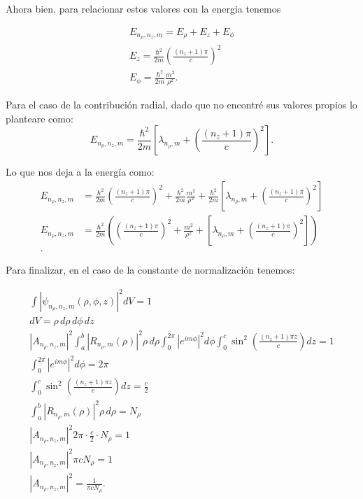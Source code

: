 \documentclass{report}
\begin{document}
Ahora bien, para relacionar estos valores con la energia tenemos

\begin{align*}
  E_{n_\rho, n_z, m} = E_\rho + E_z + E_\phi\\
  E_z = \frac{\hbar^2}{2m} \left(\frac{(n_z + 1)\pi}{c}\right)^2\\
  E_\phi = \frac{\hbar^2}{2m} \frac{m^2}{\rho^2}
.\end{align*}

Para el caso de la contribución radial, dado que no encontré sus valores propios lo planteare como:
\[
E_{n_\rho, n_z, m} = \frac{\hbar^2}{2m} \left[ \lambda_{n_\rho, m} + \left(\frac{(n_z + 1)\pi}{c}\right)^2 \right].
\]

Lo que nos deja a la energía como:
\begin{align*}
  E_{n_\rho, n_z, m} &= \frac{\hbar^2}{2m} \left(\frac{(n_z + 1)\pi}{c}\right)^2 + \frac{\hbar^2}{2m} \frac{m^2}{\rho^2} + \frac{\hbar^2}{2m} \left[ \lambda_{n_\rho, m} + \left(\frac{(n_z + 1)\pi}{c}\right)^2 \right] \\
  E_{n_\rho, n_z, m} &= \frac{\hbar^2}{2m} \left(   \left(\frac{(n_z + 1)\pi}{c}\right)^2 + \frac{m^2}{\rho^2} + \left[ \lambda_{n_\rho, m} + \left(\frac{(n_z + 1)\pi}{c}\right)^2 \right] \right)\\
.\end{align*}

Para finalizar, en el caso de la constante de normalización tenemos:

\begin{align*}
  \int |\psi_{n_\rho, n_z, m}(\rho, \phi, z)|^2 dV = 1\\
  dV = \rho \, d\rho \, d\phi \, dz\\
  |A_{n_\rho, n_z, m}|^2 \int_a^b |R_{n_\rho, m}(\rho)|^2 \rho \, d\rho \int_0^{2\pi} |e^{im\phi}|^2 d\phi \int_0^c \sin^2\left(\frac{(n_z + 1)\pi z}{c}\right) dz = 1\\
   \int_0^{2\pi} |e^{im\phi}|^2 d\phi = 2\pi\\
   \int_0^c \sin^2\left(\frac{(n_z + 1)\pi z}{c}\right) dz = \frac{c}{2}\\
   \int_a^b |R_{n_\rho, m}(\rho)|^2 \rho \, d\rho = N_\rho\\
   |A_{n_\rho, n_z, m}|^2 2\pi \cdot \frac{c}{2} \cdot N_\rho = 1\\
   |A_{n_\rho, n_z, m}|^2 \pi c N_\rho = 1\\
   |A_{n_\rho, n_z, m}|^2 = \frac{1}{\pi c N_\rho}
.\end{align*}
\end{document}
